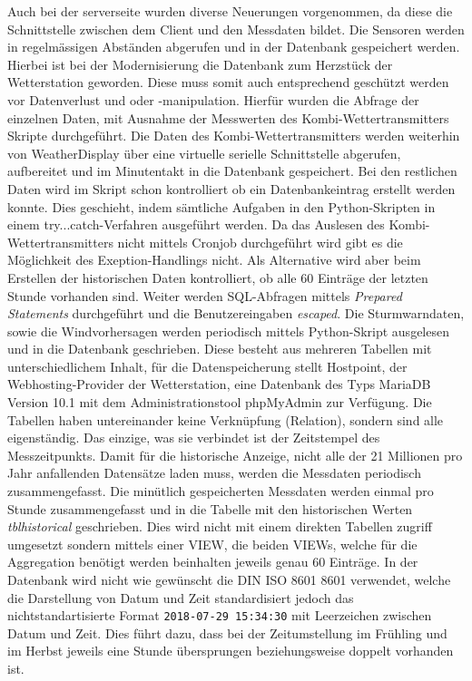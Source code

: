 \documentclass[11pt]{article}
\begin{document}
\begin{multicols}{2}
Auch bei der  serverseite wurden diverse Neuerungen vorgenommen, da diese die Schnittstelle zwischen dem Client und den Messdaten bildet. Die Sensoren werden in regelmässigen Abständen abgerufen und in der Datenbank gespeichert werden. Hierbei ist bei der Modernisierung die Datenbank zum Herzstück der Wetterstation geworden. Diese muss somit auch entsprechend geschützt werden vor Datenverlust und oder -manipulation.  Hierfür wurden die Abfrage der einzelnen Daten, mit Ausnahme der Messwerten des Kombi-Wettertransmitters Skripte durchgeführt. Die Daten des Kombi-Wettertransmitters werden weiterhin von WeatherDisplay über eine virtuelle serielle Schnittstelle abgerufen, aufbereitet und im Minutentakt in die Datenbank gespeichert. Bei den restlichen Daten wird im Skript schon kontrolliert ob ein Datenbankeintrag erstellt werden konnte. Dies geschieht, indem sämtliche Aufgaben in den Python-Skripten in einem try...catch-Verfahren ausgeführt werden. Da das Auslesen des Kombi-Wettertransmitters nicht mittels Cronjob durchgeführt wird gibt es die Möglichkeit des Exeption-Handlings nicht. Als Alternative wird aber beim Erstellen der historischen Daten kontrolliert, ob alle 60 Einträge der letzten Stunde vorhanden sind. Weiter werden SQL-Abfragen mittels \emph{Prepared Statements} durchgeführt und die Benutzereingaben \emph{escaped}. Die Sturmwarndaten, sowie die Windvorhersagen werden periodisch mittels Python-Skript ausgelesen und in die Datenbank geschrieben. Diese besteht aus mehreren Tabellen mit unterschiedlichem Inhalt, für die Datenspeicherung stellt Hostpoint, der Webhosting-Provider der Wetterstation, eine Datenbank des Typs MariaDB Version 10.1 mit dem Administrationstool phpMyAdmin zur Verfügung. Die Tabellen haben untereinander keine Verknüpfung (Relation), sondern sind alle eigenständig. Das einzige, was sie verbindet ist der Zeitstempel des Messzeitpunkts. Damit für die historische Anzeige, nicht alle der 21 Millionen pro Jahr anfallenden Datensätze laden muss, werden die Messdaten periodisch zusammengefasst. Die minütlich gespeicherten Messdaten werden einmal pro Stunde zusammengefasst und in die Tabelle mit den historischen Werten \emph{tblhistorical} geschrieben. Dies wird nicht mit einem direkten Tabellen zugriff umgesetzt sondern mittels einer VIEW, die beiden VIEWs, welche für die Aggregation benötigt werden beinhalten jeweils genau 60 Einträge. In der Datenbank wird nicht wie gewünscht die DIN ISO 8601 8601 verwendet, welche die Darstellung von Datum und Zeit standardisiert jedoch das nichtstandartisierte Format \texttt{2018-07-29 15:34:30} mit Leerzeichen zwischen Datum und Zeit. Dies führt dazu, dass bei der Zeitumstellung im Frühling und im Herbst jeweils eine Stunde übersprungen beziehungsweise doppelt vorhanden ist.\\


\end{multicols}
\end{document}
